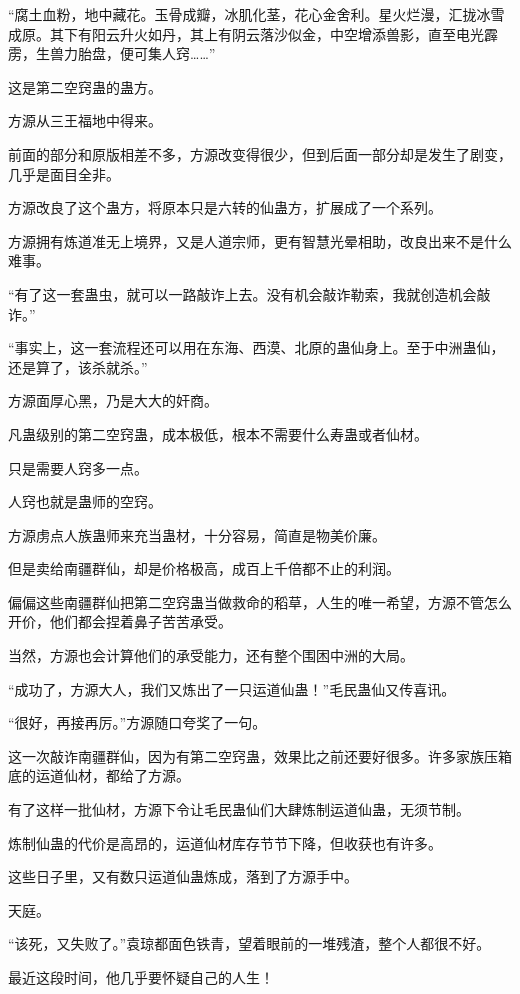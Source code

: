 \begin{this_body}
“腐土血粉，地中藏花。玉骨成瓣，冰肌化茎，花心金舍利。星火烂漫，汇拢冰雪成原。其下有阳云升火如丹，其上有阴云落沙似金，中空增添兽影，直至电光霹雳，生兽力胎盘，便可集人窍……”

这是第二空窍蛊的蛊方。

方源从三王福地中得来。

前面的部分和原版相差不多，方源改变得很少，但到后面一部分却是发生了剧变，几乎是面目全非。

方源改良了这个蛊方，将原本只是六转的仙蛊方，扩展成了一个系列。

方源拥有炼道准无上境界，又是人道宗师，更有智慧光晕相助，改良出来不是什么难事。

“有了这一套蛊虫，就可以一路敲诈上去。没有机会敲诈勒索，我就创造机会敲诈。”

“事实上，这一套流程还可以用在东海、西漠、北原的蛊仙身上。至于中洲蛊仙，还是算了，该杀就杀。”

方源面厚心黑，乃是大大的奸商。

凡蛊级别的第二空窍蛊，成本极低，根本不需要什么寿蛊或者仙材。

只是需要人窍多一点。

人窍也就是蛊师的空窍。

方源虏点人族蛊师来充当蛊材，十分容易，简直是物美价廉。

但是卖给南疆群仙，却是价格极高，成百上千倍都不止的利润。

偏偏这些南疆群仙把第二空窍蛊当做救命的稻草，人生的唯一希望，方源不管怎么开价，他们都会捏着鼻子苦苦承受。

当然，方源也会计算他们的承受能力，还有整个围困中洲的大局。

“成功了，方源大人，我们又炼出了一只运道仙蛊！”毛民蛊仙又传喜讯。

“很好，再接再厉。”方源随口夸奖了一句。

这一次敲诈南疆群仙，因为有第二空窍蛊，效果比之前还要好很多。许多家族压箱底的运道仙材，都给了方源。

有了这样一批仙材，方源下令让毛民蛊仙们大肆炼制运道仙蛊，无须节制。

炼制仙蛊的代价是高昂的，运道仙材库存节节下降，但收获也有许多。

这些日子里，又有数只运道仙蛊炼成，落到了方源手中。

天庭。

“该死，又失败了。”袁琼都面色铁青，望着眼前的一堆残渣，整个人都很不好。

最近这段时间，他几乎要怀疑自己的人生！


\end{this_body}
